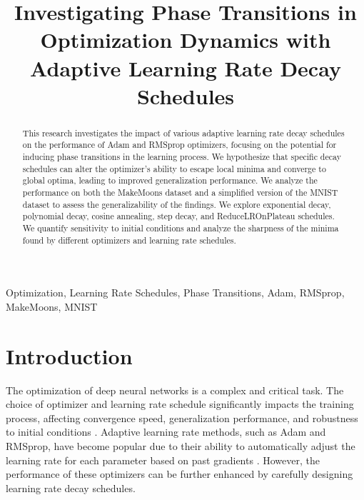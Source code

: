 \documentclass[conference]{IEEEtran}
\begin{document}
\title{Investigating Phase Transitions in Optimization Dynamics with Adaptive Learning Rate Decay Schedules}

\author{
\and
{}
}

\maketitle

\begin{abstract}
This research investigates the impact of various adaptive learning rate decay schedules on the performance of Adam and RMSprop optimizers, focusing on the potential for inducing phase transitions in the learning process. We hypothesize that specific decay schedules can alter the optimizer's ability to escape local minima and converge to global optima, leading to improved generalization performance. We analyze the performance on both the MakeMoons dataset and a simplified version of the MNIST dataset to assess the generalizability of the findings. We explore exponential decay, polynomial decay, cosine annealing, step decay, and ReduceLROnPlateau schedules. We quantify sensitivity to initial conditions and analyze the sharpness of the minima found by different optimizers and learning rate schedules.
\end{abstract}

\begin{IEEEkeywords}
Optimization, Learning Rate Schedules, Phase Transitions, Adam, RMSprop, MakeMoons, MNIST
\end{IEEEkeywords}

\section{Introduction}

The optimization of deep neural networks is a complex and critical task. The choice of optimizer and learning rate schedule significantly impacts the training process, affecting convergence speed, generalization performance, and robustness to initial conditions \cite{keskar2016large, wilson2017marginal}. Adaptive learning rate methods, such as Adam and RMSprop, have become popular due to their ability to automatically adjust the learning rate for each parameter based on past gradients \cite{kingma2014adam, tieleman2012lecture}. However, the performance of these optimizers can be further enhanced by carefully designing learning rate decay schedules.
\end{document}
